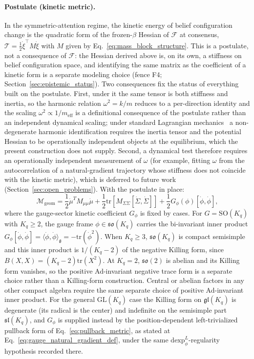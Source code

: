 \documentclass[11pt]{article}
\begin{document}
\paragraph{Postulate (kinetic metric).} In the symmetric-attention regime, the kinetic energy of belief configuration change is the quadratic form of the frozen-$\beta$ Hessian of $\mathcal{F}$ at consensus, $\mathcal{T} = \tfrac12 \dot{\xi}^\top M \dot{\xi}$ with $M$ given by Eq.~\eqref{eq:mass_block_structure}. This is a postulate, not a consequence of $\mathcal{F}$: the Hessian derived above is, on its own, a stiffness on belief configuration space, and identifying the same matrix as the coefficient of a kinetic form is a separate modeling choice (fence F4; Section~\ref{sec:epistemic_status}). Two consequences fix the status of everything built on the postulate. First, under it the same tensor is both stiffness and inertia, so the harmonic relation $\omega^2 = k/m$ reduces to a per-direction identity and the scaling $\omega^2 \propto 1/m_{\text{eff}}$ is a definitional consequence of the postulate rather than an independent dynamical scaling; under standard Lagrangian mechanics~\cite{arnold1989mathematical} a non-degenerate harmonic identification requires the inertia tensor and the potential Hessian to be operationally independent objects at the equilibrium, which the present construction does not supply. Second, a dynamical test therefore requires an operationally independent measurement of $\omega$ (for example, fitting $\omega$ from the autocorrelation of a natural-gradient trajectory whose stiffness does not coincide with the kinetic metric), which is deferred to future work (Section~\ref{sec:open_problems}). With the postulate in place:
\begin{equation}
\mathcal{M}_{\text{geom}} = \frac{1}{2}\dot{\mu}^T M_{\mu\mu} \dot{\mu} + \frac{1}{2}\mathrm{tr}\left[M_{\Sigma\Sigma}[\dot{\Sigma}, \dot{\Sigma}]\right] + \frac{1}{2} G_\phi(\phi)[\dot{\phi}, \dot{\phi}],
\label{eq:full_kinetic}
\end{equation}
where the gauge-sector kinetic coefficient $G_\phi$ is fixed by cases. For $G=\mathrm{SO}(K_q)$ with $K_q\ge2$, the gauge frame $\phi\in\mathfrak{so}(K_q)$ carries the bi-invariant inner product $G_\phi[\dot{\phi},\dot{\phi}]=\langle\dot{\phi},\dot{\phi}\rangle_{\mathfrak{g}}=-\mathrm{tr}(\dot{\phi}^2)$. When $K_q\ge3$, $\mathfrak{so}(K_q)$ is compact semisimple and this inner product is $1/(K_q-2)$ of the negative Killing form, since $B(X,X)=(K_q-2)\mathrm{tr}(X^2)$. At $K_q=2$, $\mathfrak{so}(2)$ is abelian and its Killing form vanishes, so the positive Ad-invariant negative trace form is a separate choice rather than a Killing-form construction. Central or abelian factors in any other compact algebra require the same separate choice of positive Ad-invariant inner product. For the general $\mathrm{GL}(K_q)$ case the Killing form on $\mathfrak{gl}(K_q)$ is degenerate (its radical is the center) and indefinite on the semisimple part $\mathfrak{sl}(K_q)$, and $G_\phi$ is supplied instead by the position-dependent left-trivialized pullback form of Eq.~\eqref{eq:pullback_metric}, as stated at Eq.~\eqref{eq:gauge_natural_gradient_def}, under the same $\mathrm{dexp}^{L}_\phi$-regularity hypothesis recorded there.
\end{document}
